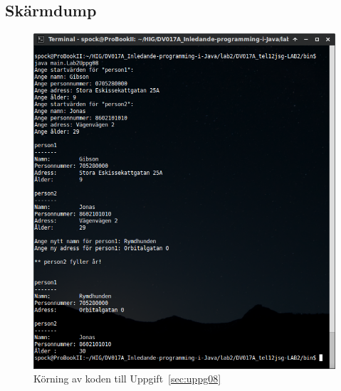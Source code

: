 \subsection{Skärmdump}
\begin{figure}[htbp]
    \centering
        \includegraphics[width=\linewidth]{img/08.png}
    \caption{Körning av koden till Uppgift~\ref{sec:uppg08}}
    \label{fig:uppg08-screenshot}
\end{figure}

